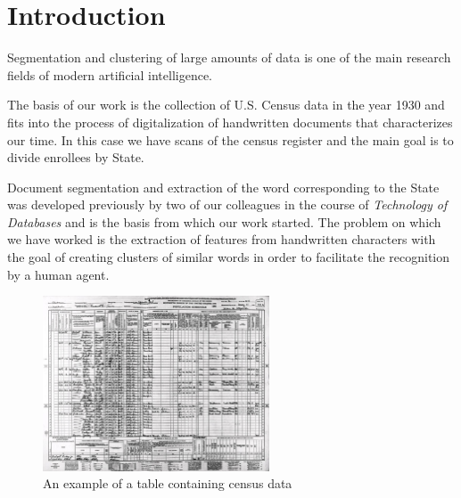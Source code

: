\section{Introduction}
Segmentation and clustering of large amounts of data is one of the main research fields of modern artificial intelligence.

The basis of our work is the collection of U.S. Census data in the year 1930 and fits into the process of digitalization of handwritten documents that characterizes our time. In this case we have scans of the census register and the main goal is to divide enrollees by State.

Document segmentation and extraction of the word corresponding to the State was developed previously by two of our colleagues in the course of \emph{Technology of Databases} and is the basis from which our work started.
The problem on which we have worked is the extraction of features from handwritten characters with the goal of creating clusters of similar words in order to facilitate the recognition by a human agent.

\begin{figure}[!ht]
\centering
\includegraphics[width=0.6\textwidth]{images/img1.jpg}
\caption{An example of a table containing census data}
\end{figure}